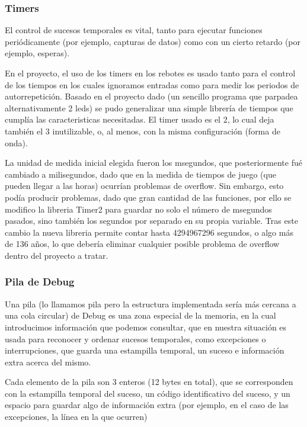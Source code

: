 \documentclass[12pt,letterpaper]{article}
\begin{document}
\subsubsection{Timers}
\label{subsubsec:timers}
El control de sucesos temporales es vital, tanto para ejecutar
funciones periódicamente (por ejemplo, capturas de datos) como con un
cierto retardo (por ejemplo, esperas).

En el proyecto, el uso de los timers en los rebotes es usado tanto
para el control de los tiempos en los cuales ignoramos entradas como
para medir los periodos de autorrepetición. Basado en el proyecto dado
(un sencillo programa que parpadea alternativamente 2 leds) se pudo
generalizar una simple librería de tiempos que cumplía las
caracteristicas necesitadas. El timer usado es el 2, lo cual deja
también el 3 inutilizable, o, al menos, con la misma configuración
(forma de onda).

La unidad de medida inicial elegida fueron los \textgreek{m}segundos,
que posteriormente fué cambiado a milisegundos, dado que en la medida
de tiempos de juego (que pueden llegar a las horas) ocurrían problemas
de overflow. Sin embargo, esto podía producir problemas, dado que gran
cantidad de las funciones, por ello se modifico la libreria Timer2
para guardar no solo el número de \textgreek{m}segundos pasados, sino
también los segundos por separado en su propia variable. Tras este
cambio la nueva libreria permite contar hasta 4294967296 segundos, o
algo más de 136 años, lo que debería eliminar cualquier posible
problema de overflow dentro del proyecto a tratar.

\subsubsection{Pila de Debug}
\label{subsubsec:pila-debug}
Una pila (lo llamamos pila pero la estructura implementada sería más
cercana a una cola circular) de Debug es una zona especial de la
memoria, en la cual introducimos información que podemos consultar,
que en nuestra situación es usada para reconocer y ordenar sucesos
temporales, como excepciones o interrupciones, que guarda una
estampilla temporal, un suceso e información extra acerca del mismo.

Cada elemento de la pila son 3 enteros (12 bytes en total), que se
corresponden con la estampilla temporal del suceso, un código
identificativo del suceso, y un espacio para guardar algo de
información extra (por ejemplo, en el caso de las excepciones, la
línea en la que ocurren)
\end{document}
